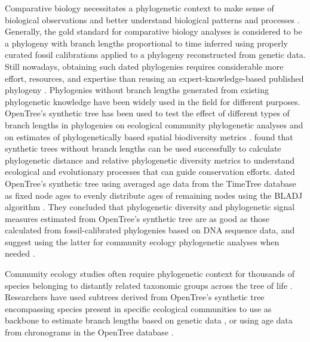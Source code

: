 \documentclass[oupdraft]{sysbio_sse}
\begin{document}
Comparative biology necessitates a phylogenetic context to make sense of biological
observations and better understand biological patterns and processes
\citep{felsenstein1985phylogenies, soltis2003role}.
Generally, the gold standard for comparative biology analyses is considered to be a phylogeny with branch lengths
proportional to time inferred using properly curated fossil calibrations applied
to a phylogeny reconstructed from genetic data. Still nowadays, obtaining such dated phylogenies requires
considerable more effort, resources, and expertise than reusing an expert-knowledge-based
published phylogeny \citep{li2019common}.
Phylogenies without branch lengths generated from existing phylogenetic knowledge
have been widely used in the field for different purposes.
OpenTree's synthetic tree has been used to test the effect of different types
of branch lengths in phylogenies on ecological community phylogenetic analyses and on estimates of
phylogenetically based spatial biodiversity metrics \citep{allen2019spatial, li2019common}.
\citep{allen2019spatial} found that synthetic trees without branch lengths can be used successfully
to calculate phylogenetic distance and relative phylogenetic diversity metrics to understand
ecological and evolutionary processes that can guide conservation efforts.
\citep{li2019common} dated OpenTree's synthetic tree using averaged age data from
the TimeTree database \citep{} as fixed node ages to evenly distribute ages of remaining
nodes using the BLADJ algorithm \citep{}. They concluded that phylogenetic diversity
and phylogenetic signal measures estimated from OpenTree's synthetic tree are as good
as those calculated from fossil-calibrated phylogenies based on DNA sequence data,
and suggest using the latter for community ecology phylogenetic analyses when needed \citep{li2019common}.

Community ecology studies often require phylogenetic context for thousands of
species belonging to distantly related taxonomic groups across the tree of life \citep{}.
Researchers have used subtrees derived from OpenTree's synthetic tree encompassing species present
in specific ecological communities to use as backbone to estimate branch lengths
based on genetic data \citep{}, or using age data from chronograms in the OpenTree database \citep{}.
\end{document}
